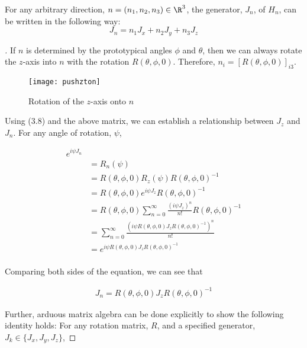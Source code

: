 \begin{theorem}
	 For any arbitrary direction, $n=(n_1,n_2,n_3)\in\R^3$, the generator, $J_n$, of $H_n$, can be written in the following way:
$$J_n = n_1J_x + n_2J_y + n_3J_z$$
\end{theorem}
\noindent \begin{proof}[\cite{Tung}] If $n$ is determined by the prototypical angles $\phi$ and $\theta$, then we can always rotate the $z$-axis into $n$ with the rotation $R(\theta,\phi,0)$. Therefore, $n_i = [R(\theta,\phi,0)]_{i3}$.

\begin{figure}[H]
	\centering
	\texttt{[image: pushzton]}
	\caption{Rotation of the $z$-axis onto $n$}
\end{figure}

Using (3.8) and the above matrix, we can establish a relationship between $J_z$ and $J_n$. For any angle of rotation, $\psi$,

\begin{equation}
	\begin{aligned}
		e^{i\psi J_n} \\
							&= R_n(\psi)	\\
							&=R(\theta,\phi,0)R_z(\psi)R(\theta,\phi,0)^{-1}\\
							&=R(\theta,\phi,0) e^{i\psi J_z} R(\theta,\phi,0)^{-1}\\ 
							&= R(\theta,\phi,0) \sum_{n=0}^\infty \frac{(i\psi J_z)^n}{n!} R(\theta,\phi,0)^{-1} \\
							&= \sum_{n=0}^\infty \frac{(i\psi R(\theta,\phi,0)J_zR(\theta,\phi,0)^{-1})^n}{n!} \\
							&= e^{i\psi R(\theta,\phi,0)J_z R(\theta,\phi,0)^{-1}}\\
	\end{aligned}
\end{equation}

Comparing both sides of the equation, we can see that 

\begin{equation}
	\begin{aligned}
		J_n = R(\theta,\phi,0)J_z R(\theta,\phi,0)^{-1}
	\end{aligned}
\end{equation}

Further, arduous matrix algebra can be done explicitly to show the following identity holds: For any rotation matrix, $R$, and a specified generator, $J_k\in\{J_x,J_y,J_z\}$,


\end{proof}
